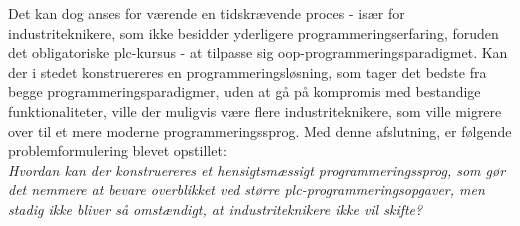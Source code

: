 Det kan dog anses for værende en tidskrævende proces - især for industriteknikere, som ikke besidder yderligere programmeringserfaring, foruden det obligatoriske \gls{plc}-kursus - at tilpasse sig \gls{oop}-programmeringsparadigmet\cite{dislikes_oop}. 
Kan der i stedet konstruereres en programmeringsløsning, som tager det bedste fra begge programmeringsparadigmer, uden at gå på kompromis med bestandige funktionaliteter, ville der muligvis være flere industriteknikere, som ville migrere over til et mere moderne programmeringssprog. Med denne afslutning, er følgende problemformulering blevet opstillet: \\

\noindent\textit{Hvordan kan der konstruereres et hensigtsmæssigt programmeringssprog, som gør det nemmere at bevare overblikket ved større \gls{plc}-programmeringsopgaver, men stadig ikke bliver så omstændigt, at industriteknikere ikke vil skifte?}



